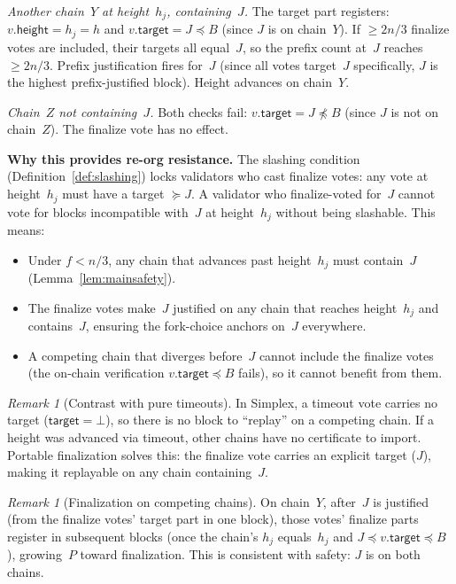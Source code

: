 \documentclass{article}
\renewcommand{\paragraph}[1]{\vspace{7pt}\noindent\textbf{#1}}
\newcommand{\target}{\mathsf{target}}
\newcommand{\height}{\mathsf{height}}
\theoremstyle{plain}
\theoremstyle{definition}
\theoremstyle{remark}
\newtheorem{remark}[theorem]{Remark}
\begin{document}
\emph{Another chain~$Y$ at height~$h_j$, containing~$J$.}
The target part registers: $v.\height = h_j = h$ and $v.\target = J \preceq B$ (since $J$ is on chain~$Y$).
If $\geq 2n/3$ finalize votes are included, their targets all equal~$J$, so the prefix count at~$J$ reaches $\geq 2n/3$.
Prefix justification fires for~$J$ (since all votes target~$J$ specifically, $J$ is the highest prefix-justified block).
Height advances on chain~$Y$.

\emph{Chain~$Z$ not containing~$J$.}
Both checks fail: $v.\target = J \not\preceq B$ (since $J$ is not on chain~$Z$).
The finalize vote has no effect.

\paragraph{Why this provides re-org resistance.}
The slashing condition (Definition~\ref{def:slashing}) locks validators who cast finalize votes: any vote at height~$h_j$ must have a target $\succeq J$.
A validator who finalize-voted for~$J$ cannot vote for blocks incompatible with~$J$ at height~$h_j$ without being slashable.
This means:
\begin{itemize}
  \item Under $f < n/3$, any chain that advances past height~$h_j$ must contain~$J$ (Lemma~\ref{lem:mainsafety}).
  \item The finalize votes make~$J$ justified on any chain that reaches height~$h_j$ and contains~$J$, ensuring the fork-choice anchors on~$J$ everywhere.
  \item A competing chain that diverges before~$J$ cannot include the finalize votes (the on-chain verification $v.\target \preceq B$ fails), so it cannot benefit from them.
\end{itemize}

\begin{remark}[Contrast with pure timeouts]
In Simplex, a timeout vote carries no target ($\target = \bot$), so there is no block to ``replay'' on a competing chain.
If a height was advanced via timeout, other chains have no certificate to import.
Portable finalization solves this: the finalize vote carries an explicit target ($J$), making it replayable on any chain containing~$J$.
\end{remark}

\begin{remark}[Finalization on competing chains]
On chain~$Y$, after~$J$ is justified (from the finalize votes' target part in one block), those votes' finalize parts register in subsequent blocks (once the chain's $h_j$ equals~$h_j$ and $J \preceq v.\target \preceq B$), growing~$P$ toward finalization.
This is consistent with safety: $J$ is on both chains.
\end{remark}
\end{document}
